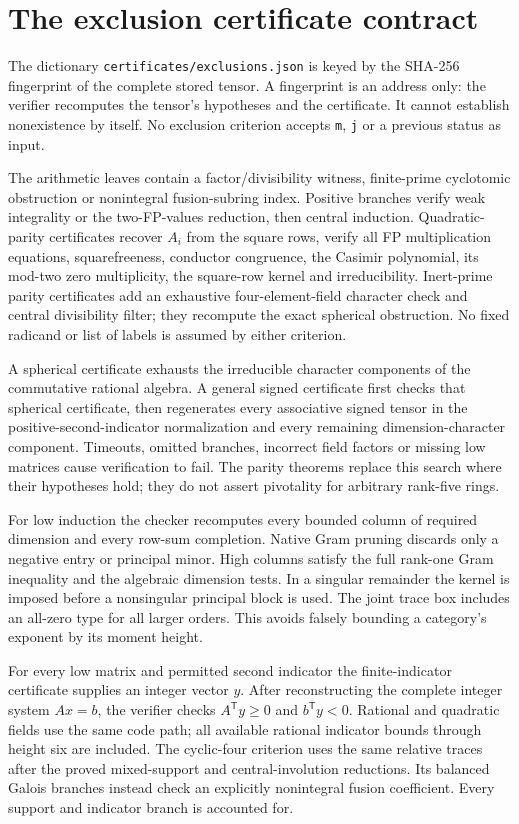 \documentclass[11pt]{article}
\begin{document}
\section{The exclusion certificate contract}
The dictionary \texttt{certificates/exclusions.json} is keyed by the
SHA-256 fingerprint of the complete stored tensor. A fingerprint is an
address only: the verifier recomputes the tensor's hypotheses and the
certificate. It cannot establish nonexistence by itself. No exclusion
criterion accepts \texttt{m}, \texttt{j} or a previous status as input.

The arithmetic leaves contain a factor/divisibility witness, finite-prime
cyclotomic obstruction or nonintegral fusion-subring index. Positive
branches verify weak integrality or the two-FP-values reduction, then
central induction. Quadratic-parity certificates recover $A_i$ from the
square rows, verify all FP multiplication equations, squarefreeness,
conductor congruence, the Casimir polynomial, its mod-two zero multiplicity,
the square-row kernel and irreducibility. Inert-prime parity certificates
add an exhaustive four-element-field character check and central
divisibility filter; they recompute the exact spherical obstruction.
No fixed radicand or list of labels is assumed by either criterion.

A spherical certificate exhausts the irreducible character components
of the commutative rational algebra. A general signed certificate first
checks that spherical certificate, then regenerates every associative
signed tensor in the positive-second-indicator normalization and every
remaining dimension-character component. Timeouts, omitted branches,
incorrect field factors or missing low matrices cause verification to
fail. The parity theorems replace this search where their hypotheses
hold; they do not assert pivotality for arbitrary rank-five rings.

For low induction the checker recomputes every bounded column of required
dimension and every row-sum completion. Native Gram pruning discards
only a negative entry or principal minor. High columns satisfy the full
rank-one Gram inequality and the algebraic dimension tests. In a
singular remainder the kernel is imposed before a nonsingular principal
block is used. The joint trace box includes an all-zero type for all
larger orders. This avoids falsely bounding a category's exponent by
its moment height.

For every low matrix and permitted second indicator the finite-indicator
certificate supplies an integer vector $y$. After reconstructing the
complete integer system $Ax=b$, the verifier checks
$A^{\mathsf T}y\ge0$ and $b^{\mathsf T}y<0$. Rational and quadratic
fields use the same code path; all available rational indicator bounds
through height six are included. The cyclic-four criterion uses the
same relative traces after the proved mixed-support and central-involution
reductions. Its balanced Galois branches instead check an explicitly
nonintegral fusion coefficient. Every support and indicator branch is
accounted for.
\end{document}
